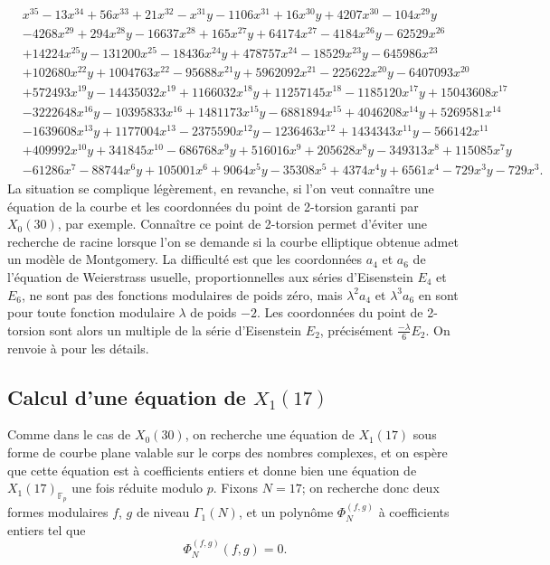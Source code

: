 \documentclass[11pt,a4paper]{article}
\newcommand{\F}{\mathbb{F}}
\theoremstyle{definition}
\begin{document}
$$ \begin{aligned}
&x^{35} - 13x^{34} + 56x^{33} + 21x^{32} - x^{31}y - 1106x^{31} + 16x^{30}y + 4207x^{30} - 104x^{29}y \\
&- 4268x^{29} + 294x^{28}y - 16637x^{28} + 165x^{27}y + 64174x^{27} - 4184x^{26}y - 62529x^{26} \\
 &+ 14224x^{25}y - 131200x^{25} - 18436x^{24}y + 478757x^{24} - 18529x^{23}y - 645986x^{23} \\
 &+ 102680x^{22}y + 1004763x^{22} - 95688x^{21}y + 5962092x^{21} - 225622x^{20}y - 6407093x^{20} \\
 &+ 572493x^{19}y - 14435032x^{19} + 1166032x^{18}y + 11257145x^{18} - 1185120x^{17}y + 15043608x^{17} \\
 &- 3222648x^{16}y - 10395833x^{16} + 1481173x^{15}y - 6881894x^{15} + 4046208x^{14}y + 5269581x^{14} \\
 &- 1639608x^{13}y + 1177004x^{13} - 2375590x^{12}y - 1236463x^{12} + 1434343x^{11}y - 566142x^{11} \\
 &+ 409992x^{10}y + 341845x^{10} - 686768x^9y + 516016x^9 + 205628x^8y - 349313x^8 + 115085x^7y \\
 &- 61286x^7 - 88744x^6y + 105001x^6 + 9064x^5y - 35308x^5 + 4374x^4y + 6561x^4 - 729x^3y - 729x^3.
\end{aligned}
$$
La situation se complique légèrement, en revanche, si l'on veut connaître une équation de la courbe et les coordonnées du point de 2-torsion garanti par $X_0(30)$, par exemple. Connaître ce point de 2-torsion permet d'éviter une recherche de racine lorsque l'on se demande si la courbe elliptique obtenue admet un modèle de Montgomery. La difficulté est que les coordonnées $a_4$ et $a_6$ de l'équation de Weierstrass \og usuelle\fg, proportionnelles aux séries d'Eisenstein $E_4$ et $E_6$, ne sont pas des fonctions modulaires de poids zéro, mais $\lambda^2 a_4$ et $\lambda^3 a_6$ en sont pour toute fonction modulaire $\lambda$ de poids $-2$. Les coordonnées du point de 2-torsion sont alors un multiple de la série d'Eisenstein $E_2$, précisément $\frac{-\lambda}{6} E_2$. On renvoie à \cite{Elkies} pour les détails.

\subsection{Calcul d'une équation de $X_1(17)$}

Comme dans le cas de $X_0(30)$, on recherche une équation de $X_1(17)$ sous forme de courbe plane valable sur le corps des nombres complexes, et on espère que cette équation est à coefficients entiers et donne bien une équation de $X_1(17)_{\F_p}$ une fois réduite modulo $p$. Fixons $N = 17$; on recherche donc deux formes modulaires $f$, $g$ de niveau $\Gamma_1(N)$, et un polynôme $\Phi_N^{(f, g)}$ à coefficients entiers tel que
$$\Phi_N^{(f, g)}(f, g) = 0.$$
\end{document}
